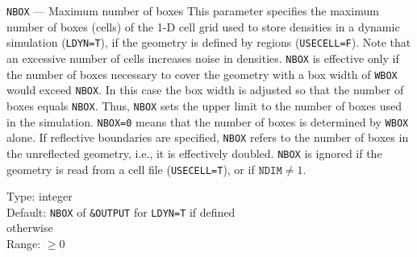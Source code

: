 \begin{keydescription}{\texttt{NBOX} --- Maximum number of boxes}
%
  This parameter specifies the maximum number of boxes (cells) of the 1-D cell 
  grid used to store densities in a dynamic simulation (\texttt{LDYN=T}), if 
  the geometry is defined by regions (\texttt{USECELL=F}). 
  Note that an excessive number of cells increases noise in densities.
  \texttt{NBOX} is effective only if the number of boxes necessary to cover 
  the geometry with a box width of \texttt{WBOX} would exceed \texttt{NBOX}. 
  In this case the box width is adjusted so that the number of boxes equals 
  \texttt{NBOX}. 
  Thus, \texttt{NBOX} sets the upper limit to the number of boxes used in the 
  simulation. 
  \texttt{NBOX=0} means that the number of boxes is determined by 
  \texttt{WBOX} alone. 
  If reflective boundaries are specified, \texttt{NBOX} refers to the number
  of boxes in the unreflected geometry, i.e., it is effectively doubled.
  \texttt{NBOX} is ignored if the geometry is read from a cell file 
  (\texttt{USECELL=T}), or if $\texttt{NDIM} \ne 1$.
  \begin{keytab}
    Type:    \> integer \\
    Default: \> \texttt{NBOX} of \texttt{\&OUTPUT} for \texttt{LDYN=T} if 
                defined \\
              otherwise \\
    Range:   \> $\ge 0$
  \end{keytab}
\end{keydescription}


